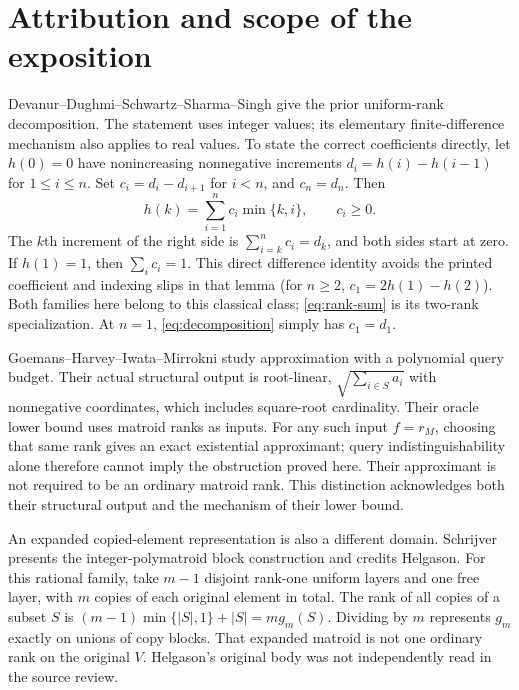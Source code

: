 \documentclass[11pt]{article}
\begin{document}
\section{Attribution and scope of the exposition}
Devanur--Dughmi--Schwartz--Sharma--Singh \cite[Appendix~D, Lemma~D.1]{ddsss} give the prior uniform-rank decomposition. The statement uses integer values; its elementary finite-difference mechanism also applies to real values. To state the correct coefficients directly, let $h(0)=0$ have nonincreasing nonnegative increments $d_i=h(i)-h(i-1)$ for $1\le i\le n$. Set $c_i=d_i-d_{i+1}$ for $i<n$, and $c_n=d_n$. Then
\begin{equation}\label{eq:decomposition}
 h(k)=\sum_{i=1}^n c_i\min\{k,i\},\qquad c_i\ge0.
\end{equation}
The $k$th increment of the right side is $\sum_{i=k}^n c_i=d_k$, and both sides start at zero. If $h(1)=1$, then $\sum_i c_i=1$. This direct difference identity avoids the printed coefficient and indexing slips in that lemma (for $n\ge2$, $c_1=2h(1)-h(2)$). Both families here belong to this classical class; \eqref{eq:rank-sum} is its two-rank specialization. At $n=1$, \eqref{eq:decomposition} simply has $c_1=d_1$.

Goemans--Harvey--Iwata--Mirrokni \cite{ghim,ghimfull} study approximation with a polynomial query budget. Their actual structural output is root-linear, $\sqrt{\sum_{i\in S}a_i}$ with nonnegative coordinates, which includes square-root cardinality. Their oracle lower bound uses matroid ranks as inputs. For any such input $f=r_M$, choosing that same rank gives an exact existential approximant; query indistinguishability alone therefore cannot imply the obstruction proved here. Their approximant is not required to be an ordinary matroid rank. This distinction acknowledges both their structural output and the mechanism of their lower bound.

An expanded copied-element representation is also a different domain. Schrijver \cite[Section~44.6b]{schrijver} presents the integer-polymatroid block construction and credits Helgason. For this rational family, take $m-1$ disjoint rank-one uniform layers and one free layer, with $m$ copies of each original element in total. The rank of all copies of a subset $S$ is $(m-1)\min\{|S|,1\}+|S|=m g_m(S)$. Dividing by $m$ represents $g_m$ exactly on unions of copy blocks. That expanded matroid is not one ordinary rank on the original $V$. Helgason's original body was not independently read in the source review.
\end{document}
